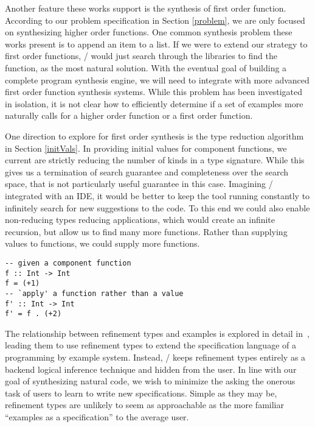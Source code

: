Another feature these works support is the synthesis of first order function.
According to our problem specification in Section \ref{problem}, we are only focused on synthesizing higher order functions. 
One common synthesis problem these works present is to append an item to a list.
If we were to extend our strategy to first order functions, \ourTool/ would just search through the libraries to find the  function, as the most natural solution. 
With the eventual goal of building a complete program synthesis engine, we will need to integrate with more advanced first order function synthesis systems.
While this problem has been investigated in isolation, it is not clear how to efficiently determine if a set of examples more naturally calls for a higher order function or a first order function.

One direction to explore for first order synthesis is the type reduction algorithm in Section \ref{initVals}.
In providing initial values for component functions, we current are strictly reducing the number of kinds in a type signature.
While this gives us a termination of search guarantee and completeness over the search space, that is not particularly useful guarantee in this case.
Imagining \ourTool/ integrated with an IDE, it would be better to keep the tool running constantly to infinitely search for new suggestions to the code.
To this end we could also enable non-reducing types reducing applications, which would create an infinite recursion, but allow us to find many more functions.
Rather than supplying values to functions, we could supply more functions.

\begin{lstlisting}[numbers=none]
-- given a component function
f :: Int -> Int
f = (+1)
-- `apply' a function rather than a value
f' :: Int -> Int
f' = f . (+2)

\end{lstlisting} 

The relationship between refinement types and examples is explored in detail in~\cite{Osera:2016}, leading them to use refinement types to extend the specification language of a programming by example system. Instead, \ourTool/ keeps refinement types entirely as a backend logical inference technique and hidden from the user. In line with our goal of synthesizing natural code, we wish to minimize the asking the onerous task of users to learn to write new specifications. Simple as they may be, refinement types are unlikely to seem as approachable as the more familiar ``examples as a specification'' to the average user. 

